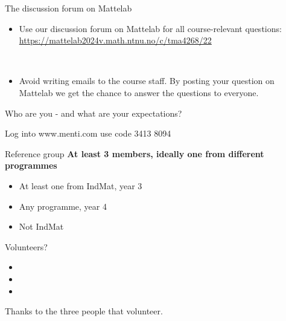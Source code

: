 \documentclass[
  10pt,
  ignorenonframetext,
]{beamer}
\providecommand{\tightlist}{%
  \setlength{\itemsep}{0pt}\setlength{\parskip}{0pt}}
\begin{document}
\begin{frame}
\begin{block}{The discussion forum on Mattelab}
\protect\hypertarget{the-discussion-forum-on-mattelab}{}
\(~\)

\begin{itemize}
\tightlist
\item
  Use our discussion forum on Mattelab for all course-relevant
  questions: \url{https://mattelab2024v.math.ntnu.no/c/tma4268/22}
\end{itemize}

\(~\)

\begin{itemize}
\tightlist
\item
  Avoid writing emails to the course staff. By posting your question on
  Mattelab we get the chance to answer the questions to everyone.
\end{itemize}
\end{block}
\end{frame}

\begin{frame}{Who are you - and what are your expectations?}
\protect\hypertarget{who-are-you---and-what-are-your-expectations}{}
\(~\)

Log into www.menti.com use code 3413 8094
\end{frame}

\begin{frame}{Reference group}
\protect\hypertarget{reference-group}{}
\textbf{At least 3 members, ideally one from different programmes}

\begin{itemize}
\tightlist
\item
  At least one from IndMat, year 3
\item
  Any programme, year 4
\item
  Not IndMat
\end{itemize}

Volunteers?

\begin{itemize}
\tightlist
\item
\item
\item
\end{itemize}

Thanks to the three people that volunteer.
\end{frame}
\end{document}
